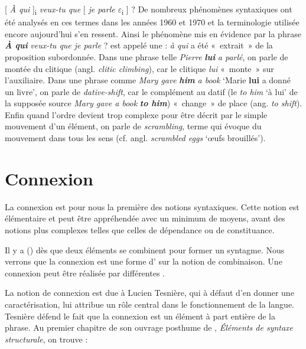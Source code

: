 {    \ea{}
        [ \textit{À qui} ]{\textsubscript{i}} \textit{veux-tu que} [ \textit{je parle} $\varepsilon ${\textsubscript{i}} ] ?
    \z
    De nombreux phénomènes syntaxiques ont été analysés en ces termes dans les années 1960 et 1970 et la terminologie utilisée encore aujourd’hui s’en ressent. Ainsi le phénomène mis en évidence par la phrase \textbf{\textit{À} \textit{qui}} \textit{veux-tu que je parle} ? est appelé une : \textit{à qui} a été «~extrait~» de la proposition subordonnée. Dans une phrase telle \textit{Pierre} \textbf{\textit{lui}} \textit{a parlé}, on parle de montée du clitique (angl. \textit{clitic climbing}), car le clitique \textit{lui} «~monte~» sur l’auxiliaire. Dans une phrase comme \textit{Mary gave} \textbf{\textit{him}} \textit{a book} ‘Marie \textbf{lui} a donné un livre’, on parle de \textit{dative-shift}, car le complément au datif (le \textit{to him} ‘à lui’ de la supposée source \textit{Mary gave a book} \textbf{\textit{to him}}) «~change~» de place (ang. \textit{to shift}). Enfin quand l’ordre devient trop complexe pour être décrit par le simple mouvement d’un élément, on parle de \textit{scrambling}, terme qui évoque du mouvement dans tous les sens (cf. angl. \textit{scrambled eggs} ‘œufs brouillés’).
}
\section{Connexion}\label{sec:3.2.8}

La connexion est pour nous la première des notions syntaxiques. Cette notion est élémentaire et peut être appréhendée avec un minimum de moyens, avant des notions plus complexes telles que celles de dépendance ou de constituance.

{Il y a  () dès que deux éléments se combinent pour former un syntagme. Nous verrons que la connexion est une forme d’ sur la notion de combinaison. Une connexion peut être réalisée par différentes .}

La notion de connexion est due à Lucien Tesnière, qui à défaut d’en donner une caractérisation, lui attribue un rôle central dans le fonctionnement de la langue. Tesnière défend le fait que la connexion est un élément à part entière de la phrase. Au premier chapitre de son ouvrage posthume de \citeyear{tesniere1959elements}, \textit{Éléments de syntaxe structurale}, on trouve :


